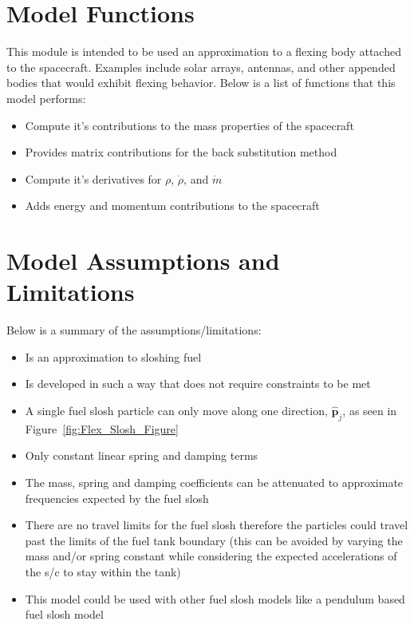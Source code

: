 \section{Model Functions}

This module is intended to be used an approximation to a flexing body attached to the spacecraft. Examples include solar arrays, antennas, and other appended bodies that would exhibit flexing behavior. Below is a list of functions that this model performs:

\begin{itemize}
	\item Compute it's contributions to the mass properties of the spacecraft
	\item Provides matrix contributions for the back substitution method
	\item Compute it's derivatives for $\rho$, $\dot{\rho}$, and $\dot{m}$
	\item Adds energy and momentum contributions to the spacecraft
\end{itemize}

\section{Model Assumptions and Limitations}
Below is a summary of the assumptions/limitations:

\begin{itemize}
	\item Is an approximation to sloshing fuel
	\item Is developed in such a way that does not require constraints to be met
	\item A single fuel slosh particle can only move along one direction, $\hat{\bm p}_j$, as seen in Figure~\ref{fig:Flex_Slosh_Figure}
	\item Only constant linear spring and damping terms
	\item The mass, spring and damping coefficients can be attenuated to approximate frequencies expected by the fuel slosh
	\item There are no travel limits for the fuel slosh therefore the particles could travel past the limits of the fuel tank boundary (this can be avoided by varying the mass and/or spring constant while considering the expected accelerations of the s/c to stay within the tank)
	\item This model could be used with other fuel slosh models like a pendulum based fuel slosh model
\end{itemize}